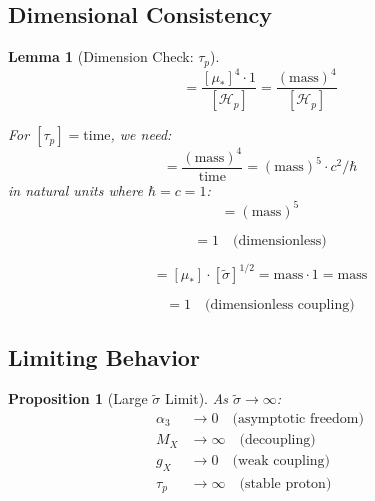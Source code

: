 \documentclass[11pt,letterpaper]{article}
\newtheorem{lemma}[theorem]{Lemma}
\newtheorem{proposition}[theorem]{Proposition}
\newcommand{\st}{\tilde{\sigma}}
\newcommand{\Hp}{\mathcal{H}_p}
\begin{document}
\subsection{Dimensional Consistency}
\label{app:dim-check}

\begin{lemma}[Dimension Check: $\tau_p$]
\label{lem:dim-taup}
\begin{equation}
[\tau_p] = \frac{[\mu_*]^4 \cdot 1}{[\Hp]} = \frac{(\text{mass})^4}{[\Hp]}
\label{eq:dim-check-taup}
\end{equation}

For $[\tau_p] = \text{time}$, we need:
\begin{equation}
[\Hp] = \frac{(\text{mass})^4}{\text{time}} = (\text{mass})^5 \cdot c^2 / \hbar
\label{eq:dim-Hp}
\end{equation}
in natural units where $\hbar = c = 1$:
\begin{equation}
[\Hp] = (\text{mass})^5
\label{eq:dim-Hp-natural}
\end{equation}
\end{lemma}

\begin{equation}
[\alpha_3] = 1 \quad \text{(dimensionless)}
\label{eq:dim-check-alpha}
\end{equation}

\begin{equation}
[M_X] = [\mu_*] \cdot [\st]^{1/2} = \text{mass} \cdot 1 = \text{mass}
\label{eq:dim-check-mx}
\end{equation}

\begin{equation}
[g_X] = 1 \quad \text{(dimensionless coupling)}
\label{eq:dim-check-gx}
\end{equation}

\subsection{Limiting Behavior}
\label{app:limits}

\begin{proposition}[Large $\st$ Limit]
\label{prop:large-sigma}
As $\st \to \infty$:
\begin{align}
\alpha_3 &\to 0 \quad \text{(asymptotic freedom)} \label{eq:lim-alpha3} \\
M_X &\to \infty \quad \text{(decoupling)} \label{eq:lim-mx} \\
g_X &\to 0 \quad \text{(weak coupling)} \label{eq:lim-gx} \\
\tau_p &\to \infty \quad \text{(stable proton)} \label{eq:lim-taup}
\end{align}
\end{proposition}
\end{document}
